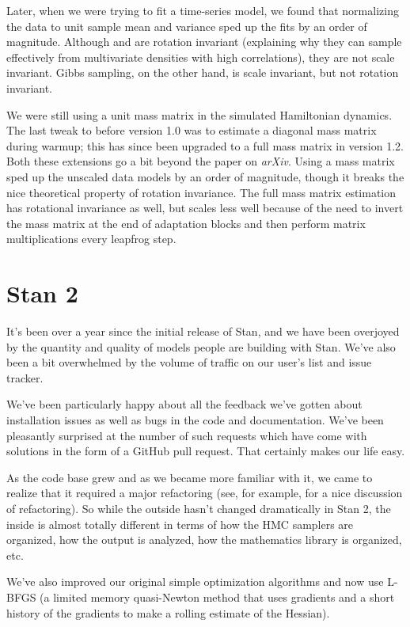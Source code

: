 Later, when we were trying to fit a time-series model, we found that
normalizing the data to unit sample mean and variance sped up the fits
by an order of magnitude.  Although \HMC and \NUTS are rotation
invariant (explaining why they can sample effectively from
multivariate densities with high correlations), they are not scale
invariant.  Gibbs sampling, on the other hand, is scale invariant, but
not rotation invariant.

We were still using a unit mass matrix in the simulated Hamiltonian
dynamics.  The last tweak to \Stan before version 1.0 was to estimate
a diagonal mass matrix during warmup; this has since been upgraded to
a full mass matrix in version 1.2.  Both these extensions go a bit
beyond the \NUTS paper on {\it arXiv}.  Using a mass matrix sped up
the unscaled data models by an order of magnitude, though it breaks
the nice theoretical property of rotation invariance.  The full mass
matrix estimation has rotational invariance as well, but scales less
well because of the need to invert the mass matrix at the end of
adaptation blocks and then perform matrix multiplications every
leapfrog step.

\section*{Stan 2}

It's been over a year since the initial release of Stan, and we have
been overjoyed by the quantity and quality of models people are
building with Stan.  We've also been a bit overwhelmed by the volume
of traffic on our user's list and issue tracker.

We've been particularly happy about all the feedback we've gotten
about installation issues as well as bugs in the code and
documentation.  We've been pleasantly surprised at the number of such
requests which have come with solutions in the form of a GitHub pull
request.  That certainly makes our life easy.

As the code base grew and as we became more familiar with it, we came
to realize that it required a major refactoring (see, for example,
\citep{FowlerEtAl:1999} for a nice discussion of refactoring).  So
while the outside hasn't changed dramatically in Stan 2, the inside is
almost totally different in terms of how the HMC samplers are
organized, how the output is analyzed, how the mathematics library is
organized, etc.  

We've also improved our original simple optimization algorithms and
now use L-BFGS (a limited memory quasi-Newton method that uses
gradients and a short history of the gradients to make a rolling
estimate of the Hessian).

